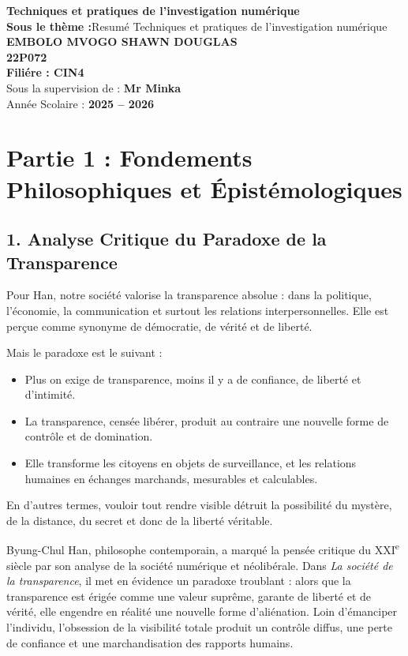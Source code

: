 \documentclass[12pt]{article}
\begin{document}
\vspace{2cm}

\begin{center}
    {\LARGE \textbf{Techniques et pratiques de l'investigation numérique}}\\[0.5cm]
    {\large \textbf{Sous le thème :}Resumé Techniques et pratiques de l'investigation numérique}\\[2cm]

    \textbf{{EMBOLO MVOGO SHAWN DOUGLAS}}\\[0.8cm]
    \textbf{{22P072}}\\[0.8cm]
    \textbf{{Filiére : CIN4}}\\[0.8cm]
    Sous la supervision de : \textbf{Mr Minka}\\[0.8cm]
    Année Scolaire : \textbf{2025 -- 2026}
\end{center}
\section*{Partie 1 : Fondements Philosophiques et Épistémologiques}

\subsection*{1. Analyse Critique du Paradoxe de la Transparence}

Pour Han, notre société valorise la transparence absolue : dans la politique, l'économie, la communication et surtout les relations interpersonnelles. Elle est perçue comme synonyme de démocratie, de vérité et de liberté.

Mais le paradoxe est le suivant :

\begin{itemize}
\item Plus on exige de transparence, moins il y a de confiance, de liberté et d'intimité.
\item La transparence, censée libérer, produit au contraire une nouvelle forme de contrôle et de domination.
\item Elle transforme les citoyens en objets de surveillance, et les relations humaines en échanges marchands, mesurables et calculables.
\end{itemize}

En d'autres termes, vouloir tout rendre visible détruit la possibilité du mystère, de la distance, du secret et donc de la liberté véritable.

Byung-Chul Han, philosophe contemporain, a marqué la pensée critique du XXI\textsuperscript{e} siècle par son analyse de la société numérique et néolibérale. Dans \emph{La société de la transparence}, il met en évidence un paradoxe troublant : alors que la transparence est érigée comme une valeur suprême, garante de liberté et de vérité, elle engendre en réalité une nouvelle forme d'aliénation. Loin d'émanciper l'individu, l'obsession de la visibilité totale produit un contrôle diffus, une perte de confiance et une marchandisation des rapports humains.
\end{document}
